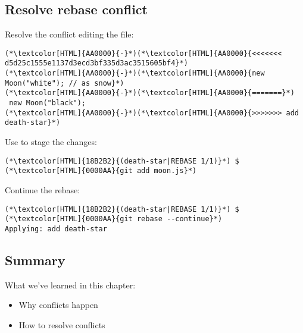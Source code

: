 \subsection{Resolve rebase conflict}
\begin{frame}[fragile]
  \subslidetitle
  Resolve the conflict editing the  file:

  \begin{lstlisting}
(*\textcolor[HTML]{AA0000}{-}*)(*\textcolor[HTML]{AA0000}{<<<<<<< d5d25c1555e1137d3ecd3bf335d3ac3515605bf4}*)
(*\textcolor[HTML]{AA0000}{-}*)(*\textcolor[HTML]{AA0000}{new Moon("white"); // as snow}*)
(*\textcolor[HTML]{AA0000}{-}*)(*\textcolor[HTML]{AA0000}{=======}*)
 new Moon("black");
(*\textcolor[HTML]{AA0000}{-}*)(*\textcolor[HTML]{AA0000}{>>>>>>> add death-star}*)
\end{lstlisting}

  \vspace{1em}
  Use  to stage the changes:
  \begin{lstlisting}
(*\textcolor[HTML]{18B2B2}{(death-star|REBASE 1/1)}*) $ (*\textcolor[HTML]{0000AA}{git add moon.js}*)
\end{lstlisting}

  Continue the rebase:
  \begin{lstlisting}
(*\textcolor[HTML]{18B2B2}{(death-star|REBASE 1/1)}*) $ (*\textcolor[HTML]{0000AA}{git rebase --continue}*)
Applying: add death-star
\end{lstlisting}
\end{frame}

\subsection{Summary}
\begin{frame}[fragile]
\subslidetitle
  What we've learned in this chapter:
  \begin{itemize}
    \item Why conflicts happen
    \item How to resolve conflicts
  \end{itemize}
\end{frame}
